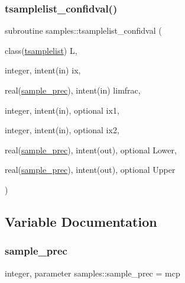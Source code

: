 \mbox{\label{namespacesamples_a1c105487cb30dfdb9dc2944330277e78}} 
\subsubsection{\texorpdfstring{tsamplelist\+\_\+confidval()}{tsamplelist\_confidval()}}
{\footnotesize\ttfamily subroutine samples\+::tsamplelist\+\_\+confidval (\begin{DoxyParamCaption}\item[{class(\mbox{\hyperlink{structsamples_1_1tsamplelist}{tsamplelist}})}]{L,  }\item[{integer, intent(in)}]{ix,  }\item[{real(\mbox{\hyperlink{namespacesamples_ab1a059d29fb6ed2517c01f6aef7713d3}{sample\+\_\+prec}}), intent(in)}]{limfrac,  }\item[{integer, intent(in), optional}]{ix1,  }\item[{integer, intent(in), optional}]{ix2,  }\item[{real(\mbox{\hyperlink{namespacesamples_ab1a059d29fb6ed2517c01f6aef7713d3}{sample\+\_\+prec}}), intent(out), optional}]{Lower,  }\item[{real(\mbox{\hyperlink{namespacesamples_ab1a059d29fb6ed2517c01f6aef7713d3}{sample\+\_\+prec}}), intent(out), optional}]{Upper }\end{DoxyParamCaption})}



\subsection{Variable Documentation}
\mbox{\label{namespacesamples_ab1a059d29fb6ed2517c01f6aef7713d3}} 
\subsubsection{\texorpdfstring{sample\+\_\+prec}{sample\_prec}}
{\footnotesize\ttfamily integer, parameter samples\+::sample\+\_\+prec = mcp}

